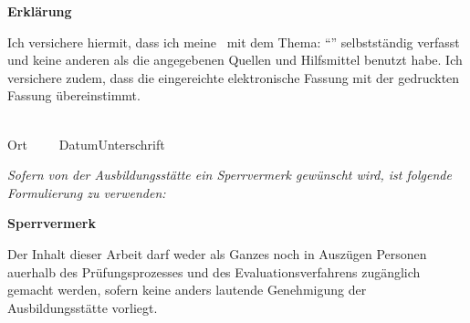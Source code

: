 

\newpage
\thispagestyle{empty}
\begin{framed}
\begin{center}
\Large\bfseries Erklärung
\end{center}
\medskip
\noindent
Ich versichere hiermit, dass ich meine \Was\ mit
dem Thema: \enquote{\Titel} selbstständig verfasst und keine anderen als die
angegebenen Quellen und Hilfsmittel benutzt habe. Ich versichere zudem, dass die eingereichte elektronische Fassung mit der
gedruckten Fassung übereinstimmt.

\vspace{3cm}
\noindent
\underline{\hspace{4cm}}\hfill\underline{\hspace{6cm}}\\
Ort~~~~~Datum\hfill Unterschrift\hspace{4cm}
\end{framed}

\vfill
\emph{Sofern von der Ausbildungsstätte ein Sperrvermerk gewünscht wird, ist folgende Formulierung
zu verwenden:}
\begin{framed}
\begin{center}
\Large\bfseries Sperrvermerk
\end{center}
\medskip
\noindent
Der Inhalt dieser Arbeit darf weder als Ganzes noch in Auszügen Personen
auerhalb des Prüfungsprozesses und des Evaluationsverfahrens zugänglich gemacht
werden, sofern keine anders lautende Genehmigung der Ausbildungsstätte vorliegt.
\end{framed}

\endinput
